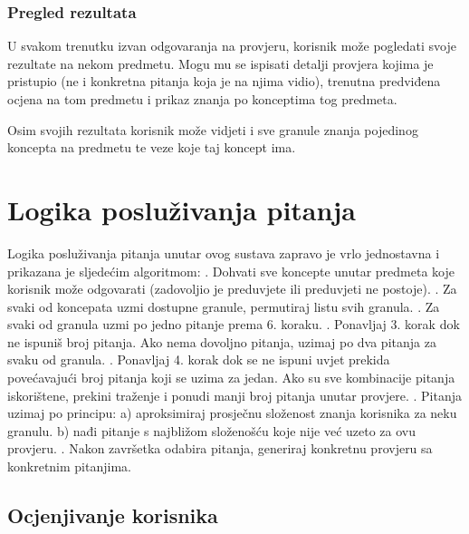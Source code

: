 \documentclass[times, utf8, zavrsni, numeric]{fer}
\begin{document}
\subsubsection{Pregled rezultata}
U svakom trenutku izvan odgovaranja na provjeru, korisnik može pogledati svoje rezultate na nekom predmetu. Mogu mu se ispisati detalji provjera kojima je pristupio (ne i konkretna pitanja koja je na njima vidio), trenutna predviđena ocjena na tom predmetu i prikaz znanja po konceptima tog predmeta.
\par
Osim svojih rezultata korisnik može vidjeti i sve granule znanja pojedinog koncepta na predmetu te veze koje taj koncept ima.

\section{Logika posluživanja pitanja}
Logika posluživanja pitanja unutar ovog sustava zapravo je vrlo jednostavna i prikazana je sljedećim algoritmom:
. Dohvati sve koncepte unutar predmeta koje korisnik može odgovarati (zadovoljio je preduvjete ili preduvjeti ne postoje).
. Za svaki od koncepata uzmi dostupne granule, permutiraj listu svih granula.
. Za svaki od granula uzmi po jedno pitanje prema 6. koraku.
. Ponavljaj 3. korak dok ne ispuniš broj pitanja. Ako nema dovoljno pitanja, uzimaj po dva pitanja za svaku od granula.
. Ponavljaj 4. korak dok se ne ispuni uvjet prekida povećavajući broj pitanja koji se uzima za jedan. Ako su sve kombinacije pitanja iskorištene, prekini traženje i ponudi manji broj pitanja unutar provjere.
. Pitanja uzimaj po principu:
\newline
a) aproksimiraj prosječnu složenost znanja korisnika za neku granulu.
\newline
b) nađi pitanje s najbližom složenošću koje nije već uzeto za  ovu provjeru.
. Nakon završetka odabira pitanja, generiraj konkretnu provjeru sa konkretnim pitanjima.

\subsection{Ocjenjivanje korisnika}
\end{document}
